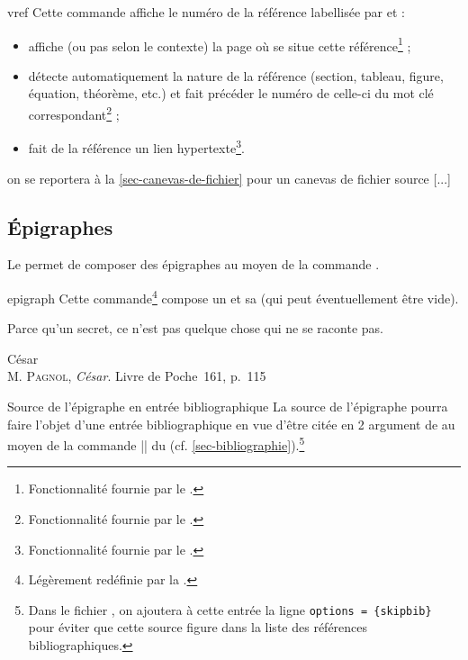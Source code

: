 \begin{docCommand}{vref}{}
  Cette commande affiche le numéro de la référence labellisée par 
  et :
  \begin{itemize}
  \item affiche (ou pas selon le contexte) la page où se situe cette
    référence\footnote{Fonctionnalité fournie par le .} ;
  \item détecte automatiquement la nature de la référence (section, tableau,
    figure, équation, théorème, etc.) et fait précéder le numéro de celle-ci du
    mot clé correspondant\footnote{Fonctionnalité fournie par le
      .} ;
  \item fait de la référence un lien hypertexte\footnote{Fonctionnalité fournie
      par le .}.
  \end{itemize}
\begin{bodycode}[listing and text,listing options={deletekeywords={[2]url,[1]math}}]
[...] on se reportera à la \vref{sec-canevas-de-fichier} pour un canevas de
fichier source [...]
\end{bodycode}
\end{docCommand}

\subsection{Épigraphes}
\label{sec-epigraphes}

Le  permet de composer des épigraphes au moyen de la commande
.

\begin{docCommand}{epigraph}{}
  Cette commande\footnote{Légèrement redéfinie par la \gztauthorcl.} compose un
   et sa  (qui peut éventuellement être vide).
\end{docCommand}

\begin{bodycode}
\epigraph{%
  Parce qu'un secret, ce n'est pas quelque chose qui ne se raconte pas. \textelp{}%
}{%
  César\\M. \textsc{Pagnol}, \emph{César}. Livre de Poche~161, p.~115%
}
\end{bodycode}

\begin{dbremark}{Source de l'épigraphe en entrée bibliographique}{}
  La source de l'épigraphe pourra faire l'objet d'une entrée bibliographique en
  vue d'être citée en 2\ieme{} argument de  au moyen de la
  commande |\fullcite| du 
  (cf. \vref{sec-bibliographie}).\footnote{%
    Dans le fichier , on ajoutera à cette entrée la ligne
    \protect\lstinline+options = {skipbib}+ pour éviter que cette source figure
    dans la liste des références bibliographiques.%
  }
\end{dbremark}

